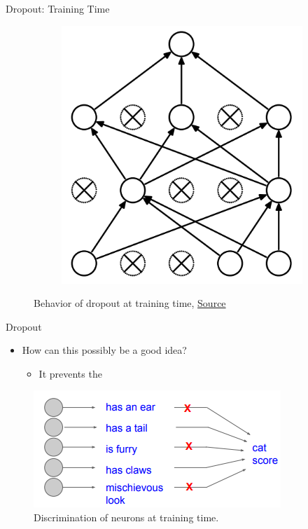 \begin{frame}{Dropout: Training Time}
\begin{figure}[H]
\begin{subfigure}[b]{0.45\textwidth}
			\includegraphics[height=0.4\textheight]{Figs/Dropout-after.png}
		\end{subfigure}
		\caption{Behavior of dropout at training time, \href{https://www.cs.toronto.edu/~hinton/absps/JMLRdropout.pdf}{Source}}
	\end{figure}
\end{frame}
\begin{frame}{Dropout}
	\begin{itemize}
		\item How can this possibly be a good idea?
		\medskip
		\begin{itemize}
			\item It prevents the 
		\end{itemize}
	\end{itemize}
	\begin{figure}[H]
		\centering
		\includegraphics[height=0.4\textheight]{Figs/section_4/dropout_why.png}
		\caption{Discrimination of neurons at training time. \cite{cs231n-2018-lecture7}}
	\end{figure}
\end{frame}
